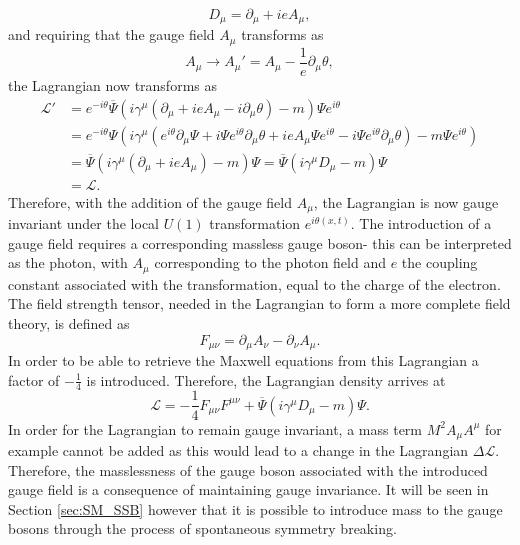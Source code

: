 \documentclass{article}
\begin{document}
\begin{equation}
D_\mu = \partial_\mu + ieA_\mu,
\end{equation}
and requiring that the gauge field $A_\mu$ transforms as
\begin{equation}
A_\mu \rightarrow A_\mu' = A_\mu - \frac{1}{e}\partial_\mu \theta,
\end{equation}
the Lagrangian now transforms as
\begin{equation}
\begin{split}
\mathcal{L'} &= e^{-i\theta}\overline{\Psi}(i\gamma^\mu (\partial_\mu + ieA_\mu - i\partial_\mu \theta) -m)\Psi e^{i\theta} \\
&=e^{-i\theta} \Psi (i\gamma^\mu (e^{i\theta}\partial_\mu \Psi + i\Psi e^{i\theta}\partial_\mu \theta + ieA_\mu \Psi e^{i\theta} - i\Psi e^{i\theta}\partial_\mu \theta ) - m\Psi e^{i\theta}) \\
&=\overline{\Psi}(i\gamma^\mu(\partial_\mu +ieA_\mu) - m)\Psi =\overline{\Psi}(i\gamma^\mu D_\mu -m)\Psi \\
& = \mathcal{L}.
\end{split}
\end{equation}
Therefore, with the addition of the gauge field $A_\mu$, the Lagrangian is now gauge invariant under the local $U(1)$ transformation $e^{i\theta(x,t)}$. The introduction of a gauge field requires a corresponding massless gauge boson- this can be interpreted as the photon, with $A_\mu$ corresponding to the photon field and $e$ the coupling constant associated with the transformation, equal to the charge of the electron.
The field strength tensor, needed in the Lagrangian to form a more complete field theory, is defined as 
\begin{equation}
    F_{\mu\nu} = \partial_\mu A_\nu - \partial_\nu A_\mu.
\end{equation}
In order to be able to retrieve the Maxwell equations from this Lagrangian a factor of $-\frac{1}{4}$ is introduced. Therefore, the Lagrangian density arrives at
\begin{equation}
\mathcal{L} = -\frac{1}{4}F_{\mu\nu}F^{\mu\nu} + \overline{\Psi}(i\gamma^\mu D_\mu -m)\Psi.
\end{equation}
In order for the Lagrangian to remain gauge invariant, a mass term $M^2A_\mu A^\mu$ for example cannot be added as this would lead to a change in the Lagrangian $\Delta \mathcal{L}$. Therefore, the masslessness of the gauge boson associated with the introduced gauge field is a consequence of maintaining gauge invariance. It will be seen in Section \ref{sec:SM_SSB} however that it is possible to introduce mass to the gauge bosons through the process of spontaneous symmetry breaking.
\end{document}
